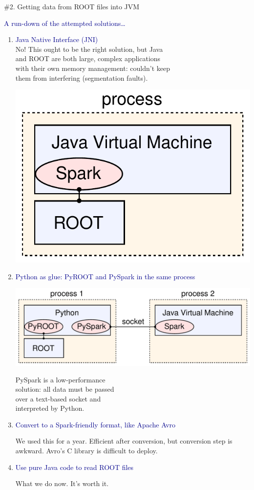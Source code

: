 \documentclass{beamer}
\begin{document}
\begin{frame}{\#2. Getting data from ROOT files into JVM}
\vspace{0.5 cm}
\small

\textcolor{darkblue}{\normalsize A run-down of the attempted solutions\ldots}
\begin{enumerate}
\item \textcolor{darkblue}{Java Native Interface (JNI)} \\ No! This ought to be the right solution, but Java \\ and ROOT are both large, complex applications \\ with their own memory management: couldn't keep \\ them from interfering (segmentation faults).

\vspace{-2.2 cm}
\hfill \includegraphics[height=1.65 cm]{root-spark.pdf}

\vspace{0.5 cm}
\item \textcolor{darkblue}{\normalsize Python as glue: PyROOT and PySpark in the same process}

\hfill \includegraphics[height=1.65 cm]{pyroot-pyspark.pdf}

\vspace{-1.8 cm}
PySpark is a low-performance \\ solution: all data must be passed \\ over a text-based socket and \\ interpreted by Python.

\item \textcolor{darkblue}{\normalsize Convert to a Spark-friendly format, like Apache Avro}

We used this for a year. Efficient after conversion, but conversion step is awkward. Avro's C library is difficult to deploy.

\item \textcolor{darkblue}{\normalsize Use pure Java code to read ROOT files}

What we do now. It's worth it.

\end{enumerate}
\end{frame}
\end{document}
